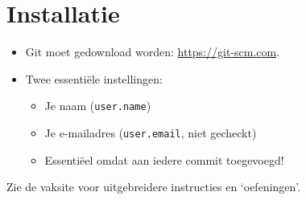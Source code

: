 \section[Get git]{Installatie}

\begin{frame}
	\begin{itemize}
		\item Git moet gedownload worden: \url{https://git-scm.com}.
		\item Twee essenti\"ele instellingen:
			\begin{itemize}
				\item Je naam (\texttt{user.name})
				\item Je e-mailadres (\texttt{user.email}, niet gecheckt)
				\item Essenti\"eel omdat aan iedere commit toegevoegd!
			\end{itemize}
	\end{itemize}
	Zie de vaksite voor uitgebreidere instructies en `oefeningen'.
\end{frame}
